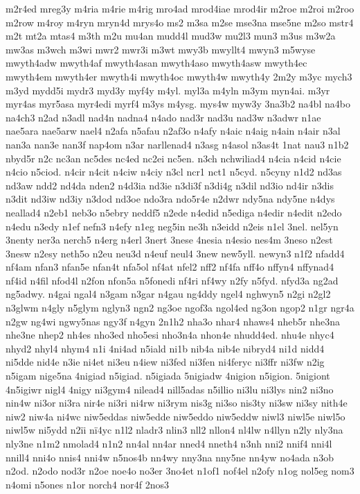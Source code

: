 {m2r4ed
mreg3y
m4ria
m4rie
m4rig
mro4ad
mrod4iae
mrod4ir
m2roe
m2roi
m2roo
m2row
m4roy
m4ryn
mryn4d
mrys4o
ms2
m3sa
m2se
mse3na
mse5ne
m2so
mstr4
m2t
mt2a
mtas4
m3th
m2u
mu4an
mudd4l
mud3w
mu2l3
mun3
m3us
m3w2a
mw3as
m3wch
m3wi
mwr2
mwr3i
m3wt
mwy3b
mwyllt4
mwyn3
m5wyse
mwyth4adw
mwyth4af
mwyth4asan
mwyth4aso
mwyth4asw
mwyth4ec
mwyth4em
mwyth4er
mwyth4i
mwyth4oc
mwyth4w
mwyth4y
2m2y
m3yc
mych3
m3yd
mydd5i
mydr3
myd3y
myf4y
m4yl.
myl3a
m4yln
m3ym
myn4ai.
m3yr
myr4as
myr5asa
myr4edi
myrf4
m3ys
m4ysg.
mys4w
myw3y
3na3b2
na4bl
na4bo
na4ch3
n2ad
n3adl
nad4n
nadna4
n4ado
nad3r
nad3u
nad3w
n3adwr
n1ae
nae5ara
nae5arw
nael4
n2afa
n5afau
n2af3o
n4afy
n4aic
n4aig
n4ain
n4air
n3al
nan3a
nan3e
nan3f
nap4om
n3ar
narllenad4
n3asg
n4asol
n3as4t
1nat
nau3
n1b2
nbyd5r
n2c
nc3an
nc5des
nc4ed
nc2ei
nc5en.
n3ch
nchwiliad4
n4cia
n4cid
n4cie
n4cio
n5ciod.
n4cir
n4cit
n4ciw
n4ciy
n3cl
ncr1
nct1
n5cyd.
n5cyny
n1d2
nd3as
nd3aw
ndd2
nd4da
nden2
n4d3ia
nd3ie
n3di3f
n3di4g
n3dil
nd3io
nd4ir
n3dis
n3dit
nd3iw
nd3iy
n3dod
nd3oe
ndo3ra
ndo5r4e
n2dwr
ndy5na
ndy5ne
n4dys
neallad4
n2eb1
neb3o
n5ebry
neddf5
n2ede
n4edid
n5ediga
n4edir
n4edit
n2edo
n4edu
n3edy
n1ef
nefn3
n4efy
n1eg
neg5in
ne3h
n3eidd
n2eis
n1el
3nel.
nel5yn
3nenty
ner3a
nerch5
n4erg
n4erl
3nert
3nese
4nesia
n4esio
nes4m
3neso
n2est
3nesw
n2esy
neth5o
n2eu
neu3d
n4euf
neul4
3new
new5yll.
newyn3
n1f2
nfadd4
nf4am
nfan3
nfan5e
nfan4t
nfa5ol
nf4at
nfel2
nff2
nf4fa
nff4o
nffyn4
nffynad4
nf4id
n4fil
nfod4l
n2fon
nfon5a
n5fonedi
nf4ri
nf4wy
n2fy
n5fyd.
nfyd3a
ng2ad
ng5adwy.
n4gai
ngal4
n3gam
n3gar
n4gau
ng4ddy
ngel4
nghwyn5
n2gi
n2gl2
n3glwm
n4gly
n5glym
nglyn3
ngn2
ng3oe
ngof3a
ngol4ed
ng3on
ngop2
n1gr
ngr4a
n2gw
ng4wi
ngwy5nas
ngy3f
n4gyn
2n1h2
nha3o
nhar4
nhaws4
nheb5r
nhe3na
nhe3ne
nhep2
nh4es
nho3ed
nho5esi
nho3n4a
nhon4e
nhudd4ed.
nhu4e
nhyc4
nhyd2
nhyl4
nhym4
n1i
4ni4ad
n5iald
ni1b
nib4a
nib4e
nibryd4
ni1d
nidd4
ni5dde
nid4e
n3ie
ni4et
ni3eu
n4iew
ni3fed
ni3fen
ni4feryc
ni3ffr
ni3fw
n2ig
n5igam
nige5na
4nigiad
n5igiad.
n5igiada
5nigiadw
4nigion
n5igion.
5nigiont
4n5igiwr
nigl4
4nigy
ni3gym4
nilead4
nill5adas
n5illio
ni3lu
ni3lys
nin2
ni3no
nin4w
ni3or
ni3ra
nir4e
ni3ri
ni4rw
ni3rym
nis3g
ni3so
nis3ty
ni3sw
ni3sy
nith4e
niw2
niw4a
ni4wc
niw5eddas
niw5edde
niw5eddo
niw5eddw
niwl3
niwl5e
niwl5o
niwl5w
ni5ydd
n2ïi
nï4yc
n1l2
nladr3
nlin3
nll2
nllon4
nl4lw
n4llyn
n2ly
nly3na
nly3ne
n1m2
nmolad4
n1n2
nn4al
nn4ar
nned4
nneth4
n3nh
nni2
nnif4
nni4l
nnill4
nni4o
nnis4
nni4w
n5nos4b
nn4wy
nny3na
nny5ne
nn4yw
no4ada
n3ob
n2od.
n2odo
nod3r
n2oe
noe4o
no3er
3no4et
n1of1
nof4el
n2ofy
n1og
nol5eg
nom3
n4omi
n5ones
n1or
norch4
nor4f
2nos3
}
